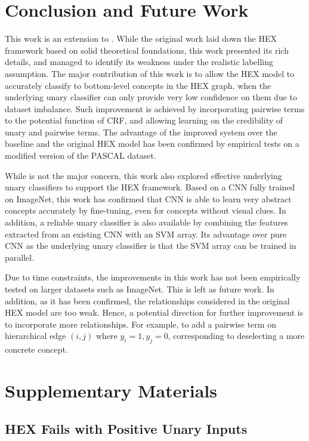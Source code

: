 \documentclass[11pt,a4paper]{book}
\begin{document}
\chapter{Conclusion and Future Work}
\label{chap:conclusion}

This work is an extension to \cite{deng2014large}. While the original work laid down the HEX framework based on solid theoretical foundations, this work presented its rich details, and managed to identify its weakness under the realistic labelling assumption. The major contribution of this work is to allow the HEX model to accurately classify to bottom-level concepts in the HEX graph, when the underlying unary classifier can only provide very low confidence on them due to dataset imbalance. Such improvement is achieved by incorporating pairwise terms to the potential function of CRF, and allowing learning on the credibility of unary and pairwise terms. The advantage of the improved system over the baseline and the original HEX model has been confirmed by empirical tests on a modified version of the PASCAL dataset.

While is not the major concern, this work also explored effective underlying unary classifiers to support the HEX framework. 
Based on a CNN \cite{krizhevsky2012imagenet} fully trained on ImageNet, this work has confirmed that CNN is able to learn very abstract concepts accurately by fine-tuning, even for concepts without visual clues. In addition, a reliable unary classifier is also available by combining the features extracted from an existing CNN with an SVM array. Its advantage over pure CNN as the underlying unary classifier is that the SVM array can be trained in parallel.

Due to time constraints, the improvements in this work has not been empirically tested on larger datasets such as ImageNet. This is left as future work. In addition, as it has been confirmed, the relationships considered in the original HEX model are too weak. Hence, a potential direction for further improvement is to incorporate more relationships. For example, to add a pairwise term on hierarchical edge $(i,j)$ where $y_i=1,y_j=0$, corresponding to deselecting a more concrete concept.

\appendix
\chapter{Supplementary Materials}
\label{chap:supplement}
\section{HEX Fails with Positive Unary Inputs}
\label{sec:fail}
\end{document}
